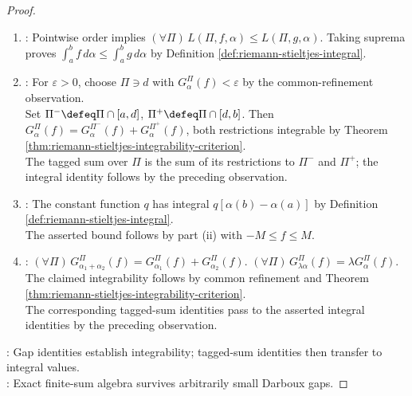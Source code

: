 \begin{theorem}
\begin{proof}
\begin{enumerate}[label=(\roman*)]
The identities $S_\alpha(f+g;\Pi,t)=S_\alpha(f;\Pi,t)+S_\alpha(g;\Pi,t)$ and $S_\alpha(cf;\Pi,t)=cS_\alpha(f;\Pi,t)$ pass to the asserted integral identities.
\item {}: Pointwise order implies $(\forall\Pi)\,L(\Pi,f,\alpha)\leq L(\Pi,g,\alpha)$. Taking suprema proves $\int_a^b f\,d\alpha\leq\int_a^b g\,d\alpha$ by Definition \ref{def:riemann-stieltjes-integral}.
\item {}: For $\varepsilon>0$, choose $\Pi\ni d$ with $G_\alpha^\Pi(f)<\varepsilon$ by the common-refinement observation.\\
Set $\Pi^-\defeq\Pi\cap[a,d]$, $\Pi^+\defeq\Pi\cap[d,b]$. Then $G_\alpha^\Pi(f)=G_\alpha^{\Pi^-}(f)+G_\alpha^{\Pi^+}(f)$, both restrictions  integrable by Theorem \ref{thm:riemann-stieltjes-integrability-criterion}.\\
The tagged sum over $\Pi$ is the sum of its restrictions to $\Pi^-$ and $\Pi^+$; the integral identity follows by the preceding observation.
\item {}: The constant function $q$ has integral $q[\alpha(b)-\alpha(a)]$ by Definition \ref{def:riemann-stieltjes-integral}.\\
The asserted bound follows by part (ii) with $-M\leq f\leq M$.
\item {}: $(\forall\Pi)\,G_{\alpha_1+\alpha_2}^\Pi(f)=G_{\alpha_1}^\Pi(f)+G_{\alpha_2}^\Pi(f)$. $(\forall\Pi)\,G_{\lambda\alpha}^\Pi(f)=\lambda G_\alpha^\Pi(f)$.\\
The claimed integrability follows by common refinement and Theorem \ref{thm:riemann-stieltjes-integrability-criterion}.\\
The corresponding tagged-sum identities pass to the asserted integral identities by the preceding observation.
\end{enumerate}
: Gap identities establish integrability; tagged-sum identities then transfer to integral values.\\
: Exact finite-sum algebra survives arbitrarily small Darboux gaps.
\end{proof}
\end{theorem}

